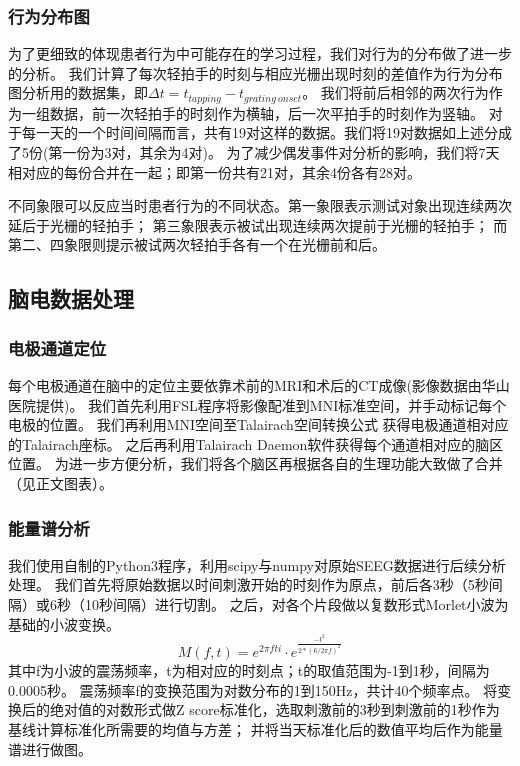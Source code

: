 \subsubsection{行为分布图}
为了更细致的体现患者行为中可能存在的学习过程，我们对行为的分布做了进一步的分析。
我们计算了每次轻拍手的时刻与相应光栅出现时刻的差值作为行为分布图分析用的数据集，即$\Delta t = t_{tapping} - t_{grating\ onset}$。
我们将前后相邻的两次行为作为一组数据，前一次轻拍手的时刻作为横轴，后一次平拍手的时刻作为竖轴。
对于每一天的一个时间间隔而言，共有19对这样的数据。我们将19对数据如上述分成了5份(第一份为3对，其余为4对)。
为了减少偶发事件对分析的影响，我们将7天相对应的每份合并在一起；即第一份共有21对，其余4份各有28对。

不同象限可以反应当时患者行为的不同状态。第一象限表示测试对象出现连续两次延后于光栅的轻拍手；
第三象限表示被试出现连续两次提前于光栅的轻拍手；
而第二、四象限则提示被试两次轻拍手各有一个在光栅前和后。

\subsection{脑电数据处理}

\subsubsection{电极通道定位}

每个电极通道在脑中的定位主要依靠术前的MRI和术后的CT成像(影像数据由华山医院提供)。
我们首先利用FSL程序\cite{fsl}将影像配准到MNI标准空间，并手动标记每个电极的位置。
我们再利用MNI空间至Talairach空间转换公式\cite{bioelectromagnetism} %
获得电极通道相对应的Talairach座标。
之后再利用Talairach Daemon软件\cite{talairach_daemon}获得每个通道相对应的脑区位置。
为进一步方便分析，我们将各个脑区再根据各自的生理功能大致做了合并（见正文图表）。%

\subsubsection{能量谱分析}

我们使用自制的Python3程序，利用scipy\cite{scipy}与numpy\cite{numpy,oliphant2007python}对原始SEEG数据进行后续分析处理。
我们首先将原始数据以时间刺激开始的时刻作为原点，前后各3秒（5秒间隔）或6秒（10秒间隔）进行切割。
之后，对各个片段做以复数形式Morlet小波为基础的小波变换。
\begin{equation}
    M(f, t) = e ^ {2 \pi f t i} \cdot e ^ {\frac{-t^2}{2 * (6 / 2 \pi f)^2}}
\end{equation}
其中f为小波的震荡频率，t为相对应的时刻点；t的取值范围为-1到1秒，间隔为0.0005秒。
震荡频率f的变换范围为对数分布的1到150Hz，共计40个频率点。
将变换后的绝对值的对数形式做Z score标准化，选取刺激前的3秒到刺激前的1秒作为基线计算标准化所需要的均值与方差；
并将当天标准化后的数值平均后作为能量谱进行做图。


